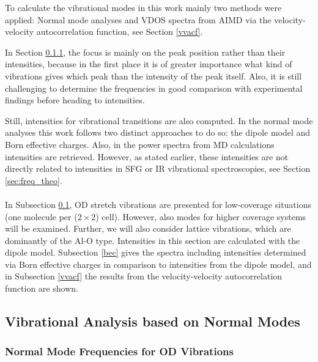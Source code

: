 \documentclass[11pt,DIV=13,BCOR=5mm,a4paper,headinclude]{scrbook}
\begin{document}
To calculate the vibrational modes in this work mainly two methods were applied: Normal mode analyses and VDOS spectra from AIMD via the velocity-velocity autocorrelation function, see Section \ref{vvacf}.


In Section \ref{nma-OD}, the focus is mainly on the peak position rather than their intensities, because in the first place it is of greater importance what kind of vibrations gives which peak than the intensity of the peak itself.
Also, it is still challenging to determine the frequencies in good comparison with experimental findings before heading to intensities.

Still, intensities for vibrational transitions are also computed.
In the normal mode analyses this work follows two distinct approaches to do so: the dipole model and Born effective charges.
Also, in the power spectra from MD calculations intensities are retrieved.
However, as stated earlier, these intensities are not directly related to intensities in SFG or IR vibrational spectroscopies, see Section \ref{sec:freq_theo}.
\\\\

In Subsection \ref{nma}, OD stretch vibrations are presented for low-coverage situations (one molecule per ($2\times 2$) cell).
However, also modes for higher coverage systems will be examined.
Further, we will also consider lattice vibrations, which are dominantly of the Al-O type.
Intensities in this section are calculated with the dipole model.
Subsection \ref{bec} gives the spectra including intensities determined via Born effective charges in comparison to intensities from the dipole model, and in Subsection \ref{vvacf} the results from the velocity-velocity autocorrelation function are shown.


\subsection{Vibrational Analysis based on Normal Modes}\label{nma}
\subsubsection{Normal Mode Frequencies for OD Vibrations}\label{nma-OD}
\end{document}
